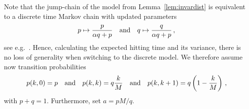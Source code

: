\documentclass{article}
\numberwithin{equation}{section}
\newcommand{\rk}[1]{\left(#1\right)}
\newcommand{\1}{\mathbbm{1}}
\begin{document}
Note that the jump-chain of the model from Lemma~\ref{lem:invardist} is equivalent to a discrete time Markov chain with updated parameters
\begin{equation}
    p\mapsto \frac{p}{\alpha q+p}\quad\textnormal{and}\quad q\mapsto \frac{q}{\alpha q+p}\, ,
\end{equation}
see e.g.~\cite{levin2017markov}. Hence, calculating the expected hitting time and its variance, there is no loss of generality when switching to the discrete model. We therefore assume now transition probabilities
\begin{equation}
    p(k,0)=p\quad\textnormal{and}\quad p(k,k)=q\frac{k}{M}\quad\textnormal{and}\quad p(k,k+1)=q\rk{1-\frac{k}{M}}\, ,
\end{equation}
with $p+q=1$. Furthermore, set $a=pM/q$.
\end{document}
